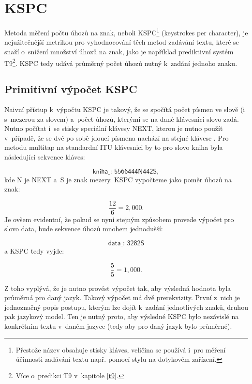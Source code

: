 \documentclass[a4paper,11pt,openany]{book} %
\newcommand\exmp{\textsf}
\begin{document}
\section{KSPC}

Metoda měření počtu úhozů na znak, neboli KSPC\footnote{Přestože název obsahuje stisky kláves, veličina se používá i~pro měření účinnosti zadávání textu např. pomocí stylu na dotykovém zařízení.} (keystrokes per character), je nejužitečnější metrikou pro vyhodnocování těch metod zadávání textu, které se snaží o~snížení množství úhozů na znak, jako  je například prediktivní systém T9\footnote{Více o~predikci T9 v~kapitole \ref{t9}.}. KSPC tedy udává průměrný počet úhozů nutný k~zadání jednoho znaku.

\subsection{Primitivní výpočet KSPC}

Naivní přístup k~výpočtu KSPC je takový, že se spočítá počet písmen ve slově (i s~mezerou za slovem) a~počet úhozů, kterými se na dané klávesnici slovo zadá. Nutno počítat i~se stisky speciální klávesy \exmp{NEXT}, kterou je nutno použít v~případě, že se dvě po sobě jdoucí písmena nachází na stejné klávese \parencite[10]{silfverberg2000predicting}. %
Pro metodu multitap na standardní ITU klávesnici by to pro slovo \exmp{kniha} byla následující sekvence kláves:

\[
	\exmp{kniha\_: 5566444N442S},
\]
kde \exmp{N} je \exmp{NEXT} a~\exmp{S} je znak mezery. KSPC vypočteme jako poměr úhozů na znak:

\[
	\frac{12}{6} = 2,000.
\]
Je ovšem evidentní, že pokud se nyní stejným způsobem provede výpočet pro slovo \exmp{data}, bude sekvence úhozů mnohem jednodušší:

\[
	\exmp{data\_: 3282S}
\]
a KSPC tedy vyjde:

\[
	\frac{5}{5} = 1,000.
\]

Z toho vyplývá, že je nutno provést výpočet tak, aby výsledná hodnota byla průměrná pro daný jazyk. Takový výpočet má dvě prerekvizity. První z~nich je jednoznačný popis postupu, kterým lze dojít k~zadání jednotlivých znaků, druhou pak jazykový model. Ten je nutný proto, aby výsledné KSPC bylo nezávislé na konkrétním textu v~daném jazyce (tedy aby pro daný jazyk bylo průměrné). \parencite[196]{mackenzie2002kspc}
\end{document}
